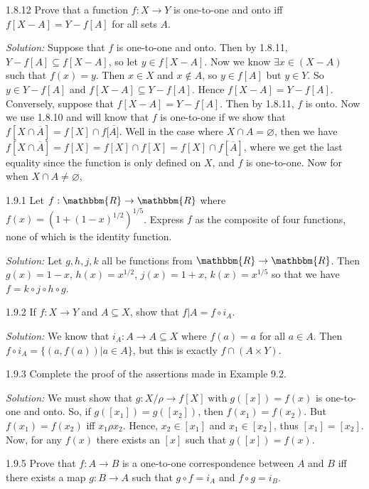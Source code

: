 \documentclass{letter}
\newcommand{\nin}{\not\in}
\newcommand{\tmop}[1]{\ensuremath{\operatorname{#1}}}
\newcommand{\tmtextit}[1]{{\itshape{#1}}}
\begin{document}
1.8.12 Prove that a function $f : X \rightarrow Y$ is one-to-one and onto iff
$f [X - A] = Y - f [A]$ for all sets $A$.

\tmtextit{Solution:} Suppose that $f$ is one-to-one and onto. Then by 1.8.11,
$Y - f [A] \subseteq f [X - A]$, so let $y \in f [X - A]$. Now we know
$\exists x \in (X - A)$ such that $f (x) = y$. Then $x \in X$ and $x \nin A$,
so $y \in f [A]$ but $y \in Y$. So $y \in Y - f [A]$ and $f [X - A] \subseteq
Y - f [A]$. Hence $f [X - A] = Y - f [A]$. Conversely, suppose that $f [X - A]
= Y - f [A]$. Then by 1.8.11, $f$ is onto. Now we use 1.8.10 and will know
that $f$ is one-to-one if we show that $f [X \cap \overline{A}] = f [X] \cap f
[ \overline{A]}$. Well in the case where $X \cap A = \varnothing$, then we
have $f [X \cap \overline{A}] = f [X] = f [X] \cap f [X] = f [X] \cap f [
\overline{A}]$, where we get the last equality since the function is only
defined on $X$, and $f$ is one-to-one. Now for when $X \cap A \neq
\varnothing$,

1.9.1 Let $f : \mathbbm{R} \rightarrow \mathbbm{R}$ where $f (x) = (1 + (1 -
x)^{1 / 2})^{1 / 5}$. Express $f$ as the composite of four functions, none of
which is the identity function.

\tmtextit{Solution:} Let $g, h, j, k$ all be functions from $\mathbbm{R}
\rightarrow \mathbbm{R}$. Then $g (x) = 1 - x$, $h (x) = x^{1 / 2}$, $j (x) =
1 + x$, $k (x) = x^{1 / 5}$ so that we have $f = k \circ j \circ h \circ g$.

1.9.2 If $f : X \rightarrow Y$ and $A \subseteq X$, show that $f | A = f \circ
i_A$.

\tmtextit{Solution:} We know that $i_A : A \rightarrow A \subseteq X$ where
$f (a) = a$ for all $a \in A$. Then $f \circ i_A =\{(a, f (a)) | a \in A\}$,
but this is exactly $f \cap (A \times Y)$.

1.9.3 Complete the proof of the assertions made in Example 9.2.

\tmtextit{Solution:} We must show that $g : X / \rho \rightarrow f [X]
\tmop{with} g ([x]) = f (x)$ is one-to-one and onto. So, if $g ([x_1]) = g
([x_2])$, then $f (x_1) = f (x_2)$. But $f (x_1) = f (x_2)$ iff $x_1 \rho
x_2$. Hence, $x_2 \in [x_1]$ and $x_1 \in [x_2]$, thus $[x_1] = [x_2]$. Now,
for any $f (x)$ there exists an $[x]$ such that $g ([x]) = f (x)$. \

1.9.5 Prove that $f : A \rightarrow B$ is a one-to-one correspondence between
$A$ and $B$ iff there exists a map $g : B \rightarrow A$ such that $g \circ f
= i_A$ and $f \circ g = i_B$.
\end{document}

